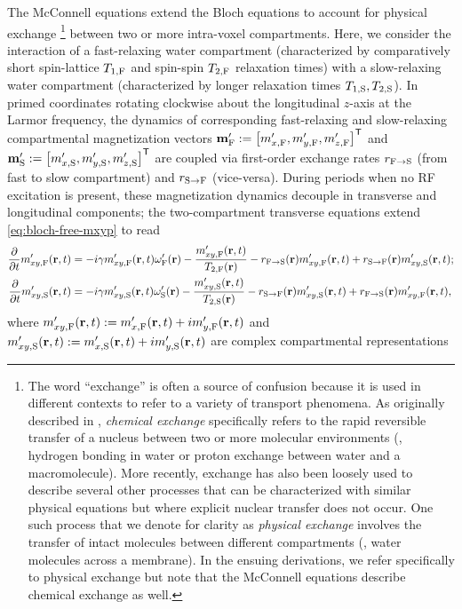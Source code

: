 The McConnell equations \cite{mcconnell:58:rrb}
extend the Bloch equations \cite{bloch:1946:ni-paper}
to account for physical exchange
\footnote{The word ``exchange'' 
is often a source of confusion 
because it is used in different contexts
to refer to a variety of transport phenomena.
As originally described in \cite{mcconnell:58:rrb},
\emph{chemical exchange} specifically refers 
to the rapid reversible transfer
of a nucleus 
between two or more molecular environments
(\eg, hydrogen bonding in water
or proton exchange 
between water and a macromolecule). 
More recently,
exchange has also been loosely used 
to describe several other processes
that can be characterized
with similar physical equations
but where explicit nuclear transfer does not occur.
One such process
that we denote for clarity
as \emph{physical exchange}
involves the transfer
of intact molecules 
between different compartments
(\eg, water molecules across a membrane).
In the ensuing derivations,
we refer specifically
to physical exchange
but note that the McConnell equations
describe chemical exchange as well.
}
between two or more intra-voxel compartments.
Here,
we consider the interaction
of a fast-relaxing water compartment
(characterized by comparatively short spin-lattice $T_{1,\mathrm{F}}$ 
and spin-spin $T_{2,\mathrm{F}}$ relaxation times) 
with a slow-relaxing water compartment
(characterized by longer relaxation times $T_{1,\mathrm{S}},T_{2,\mathrm{S}}$).
In primed coordinates rotating clockwise 
about the longitudinal $z$-axis
at the Larmor frequency,
the dynamics 
of corresponding fast-relaxing and slow-relaxing
compartmental magnetization vectors
$\bmmpf := \brac{\mxpf, \mypf, \mzpf}\tpose$
and
$\bmmps := \brac{\mxps, \myps, \mzps}\tpose$
are coupled via first-order exchange rates 
$r_{\mathrm{F}\to\mathrm{S}}$ (from fast to slow compartment) 
and $r_{\mathrm{S}\to\mathrm{F}}$ (vice-versa).
During periods when no RF excitation is present,
these magnetization dynamics
decouple in transverse and longitudinal components;
the two-compartment transverse equations 
extend \eqref{eq:bloch-free-mxyp} to read
\begin{align}
	\dela{t} \mxypf\prt &= 
		-i\gam \mxypf\prt \ompf\pr - \frac{\mxypf\prt}{\tf{2}\pr} 
		- \rfs\pr \mxypf\prt + \rsf\pr \mxyps\prt;
		\label{eq:mwf,mxy-f} \\
	\dela{t} \mxyps\prt &= 
		-i\gam \mxyps\prt \omps\pr - \frac{\mxyps\prt}{\ts{2}\pr} 
		- \rsf\pr \mxyps\prt + \rfs\pr \mxypf\prt,
		\label{eq:mwf,mxy-s}
\end{align}
where 
$\mxypf\prt := \mxpf\prt + i\mypf\prt$ 
and $\mxyps\prt := \mxps\prt + i\myps\prt$
are complex compartmental representations
